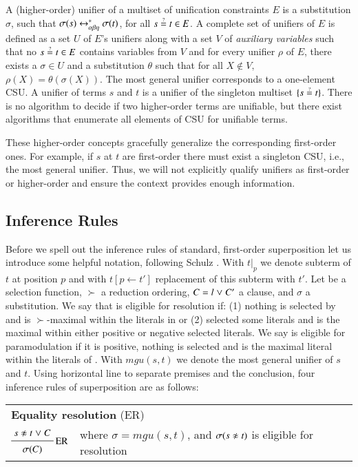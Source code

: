 A (higher-order) unifier of a multiset of unification constraints $E$ is
a substitution $\sigma$, such that $\sigma(s) \leftrightarrow^*_{\alpha\beta\eta} \sigma(t)$, for all $s \unif t
\in E$. A complete set of unifiers of $E$ is defined as a
set $U$ of $E$'s unifiers along with a set $V$ of \emph{auxiliary variables}
such that no $s \unif t \in E$ contains variables from $V$ and for every unifier
$\rho$ of $E$, there exists a $\sigma \in U$ and a substitution $\theta$ such
that for all $X\not\in V,$ $\rho(X) = \theta(\sigma(X))$. The most general unifier
corresponds to a one-element CSU. A unifier of terms $s$ and $t$ is a unifier of
the singleton multiset $\{ s \unif t \}$. There is no algorithm to decide
if two higher-order terms are unifiable, but there exist algorithms
that enumerate all elements of CSU for unifiable terms.

These higher-order concepts gracefully generalize the corresponding first-order
ones. For example, if $s$ at $t$ are first-order there must exist a singleton
CSU, i.e., the most general unifier. Thus, we will not explicitly qualify
unifiers as first-order or higher-order and ensure the context provides enough
information.

\subsection{Inference Rules}
\label{sec:pre:rules}
\newcommand{\mgu}{\ensuremath{\mathit{mgu}}}

Before we spell out the inference rules of standard, first-order superposition
let us introduce some helpful notation, following Schulz \cite{ss-02-brainiac}.
With $t|_p$ we denote subterm of $t$ at position $p$ and with $t[p \leftarrow
t']$ replacement of this subterm with $t'$. Let \selfun{} be a selection function,
$\succ$ a reduction ordering, $C = l \mathrel\lor C'$ a clause, and $\sigma$ a
substitution. We say that  is eligible for resolution if: (1) nothing
is selected by \selfun{} and  is $\succ$-maximal within the literals in
 or (2) \selfun{} selected some literals and  is the maximal
within either positive or negative selected literals. We say  is
eligible for paramodulation if it is positive, nothing is selected and
 is the maximal literal within the literals of . With
$\mgu(s,t)$ we denote the most general unifier of $s$ and $t$. Using horizontal
line to separate premises and the conclusion, four inference rules of
superposition are as follows:

\begin{tabular}{m{}m{}}
    \multicolumn{2}{l}{{\bf Equality resolution} (ER)} \\[\jot]
    $\namedinference{ER}{s \noteq t \llor C}{\sigmacl{C}}$ & where $\sigma = \mgu(s,t)$, and $\sigmacl{s \noteq t}$ is eligible for resolution
\end{tabular}

